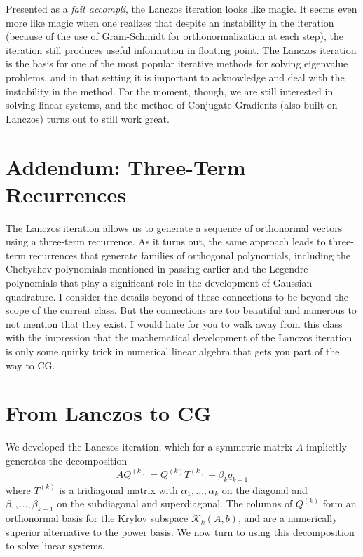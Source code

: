 \documentclass[12pt, leqno]{article}
\newcommand{\calK}{\mathcal{K}}
\begin{document}
Presented as a {\em fait accompli}, the Lanczos iteration looks like
magic.  It seems even more like magic when one realizes that despite
an instability in the iteration (because of the use of Gram-Schmidt
for orthonormalization at each step), the iteration still produces
useful information in floating point.  The Lanczos iteration is the
basis for one of the most popular iterative methods for solving
eigenvalue problems, and in that setting it is important to
acknowledge and deal with the instability in the method.  For the
moment, though, we are still interested in solving linear systems,
and the method of Conjugate Gradients (also built on Lanczos)
turns out to still work great.

\section{Addendum: Three-Term Recurrences}

The Lanczos iteration allows us to generate a sequence of orthonormal
vectors using a three-term recurrence.  As it turns out, the same
approach leads to three-term recurrences that generate families of
orthogonal polynomials, including the Chebyshev polynomials mentioned
in passing earlier and the Legendre polynomials that play
a significant role in the development of Gaussian quadrature.  I
consider the details beyond of these connections to be beyond the
scope of the current class.  But the connections are too beautiful and
numerous to not mention that they exist.  I would hate for you to walk
away from this class with the impression that the mathematical
development of the Lanczos iteration is only some quirky trick in
numerical linear algebra that gets you part of the way to CG.

\section*{From Lanczos to CG}

We developed the Lanczos iteration, which for a symmetric matrix $A$
implicitly generates the decomposition
\[
  A Q^{(k)} = Q^{(k)} T^{(k)} + \beta_k q_{k+1}
\]
where $T^{(k)}$ is a tridiagonal matrix with $\alpha_1, \ldots,
\alpha_k$ on the diagonal and $\beta_1, \ldots, \beta_{k-1}$ on
the subdiagonal and superdiagonal.  The columns of $Q^{(k)}$ form
an orthonormal basis for the Krylov subspace $\calK_{k}(A,b)$,
and are a numerically superior alternative to the power basis.
We now turn to using this decomposition to solve linear systems.
\end{document}
